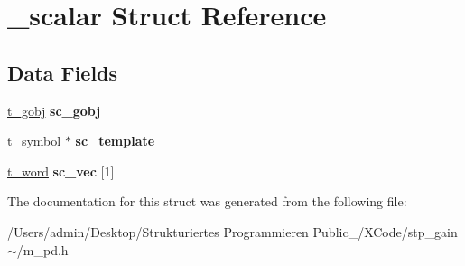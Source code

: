 \hypertarget{struct__scalar}{}\section{\+\_\+scalar Struct Reference}
\label{struct__scalar}
\subsection*{Data Fields}
\begin{DoxyCompactItemize}
\item 
\mbox{\label{struct__scalar_ad57409a25a6fe7161b4c37c6f38d2659}} 
\hyperlink{struct__gobj}{t\+\_\+gobj} {\bfseries sc\+\_\+gobj}
\item 
\mbox{\label{struct__scalar_aa3dcf6e4178004509e9f4a3d75fb5554}} 
\hyperlink{struct__symbol}{t\+\_\+symbol} $\ast$ {\bfseries sc\+\_\+template}
\item 
\mbox{\label{struct__scalar_a82e1e7b736772d6cc4c722c204b1ac18}} 
\hyperlink{unionword}{t\+\_\+word} {\bfseries sc\+\_\+vec} \mbox{[}1\mbox{]}
\end{DoxyCompactItemize}


The documentation for this struct was generated from the following file\+:\begin{DoxyCompactItemize}
\item 
/\+Users/admin/\+Desktop/\+Strukturiertes Programmieren Public\+\_/\+X\+Code/stp\+\_\+gain$\sim$/m\+\_\+pd.\+h\end{DoxyCompactItemize}
